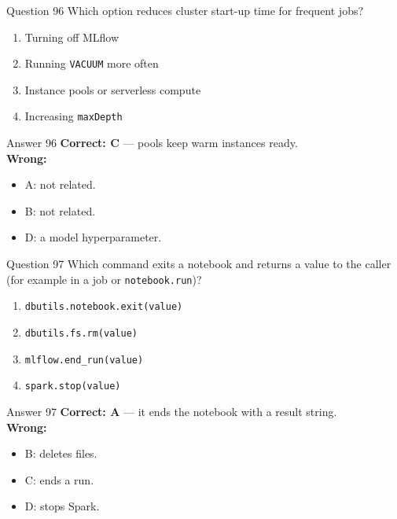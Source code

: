 \documentclass[aspectratio=169,11pt]{beamer}
\begin{document}
\begin{frame}{Question 96}
Which option reduces cluster start-up time for frequent jobs?
\begin{enumerate}[label=\Alph*.]
\item Turning off MLflow
\item Running \texttt{VACUUM} more often
\item Instance pools or serverless compute
\item Increasing \texttt{maxDepth}
\end{enumerate}
\end{frame}
\begin{frame}{Answer 96}
\textbf{Correct: C} --- pools keep warm instances ready.\\
\vspace{0.5em}
\textbf{Wrong:}
\begin{itemize}
\item A: not related.
\item B: not related.
\item D: a model hyperparameter.
\end{itemize}
\end{frame}

\begin{frame}{Question 97}
Which command exits a notebook and returns a value to the caller (for example in a job or \texttt{notebook.run})?
\begin{enumerate}[label=\Alph*.]
\item \texttt{dbutils.notebook.exit(value)}
\item \texttt{dbutils.fs.rm(value)}
\item \texttt{mlflow.end\_run(value)}
\item \texttt{spark.stop(value)}
\end{enumerate}
\end{frame}
\begin{frame}{Answer 97}
\textbf{Correct: A} --- it ends the notebook with a result string.\\
\vspace{0.5em}
\textbf{Wrong:}
\begin{itemize}
\item B: deletes files.
\item C: ends a run.
\item D: stops Spark.
\end{itemize}
\end{frame}
\end{document}
